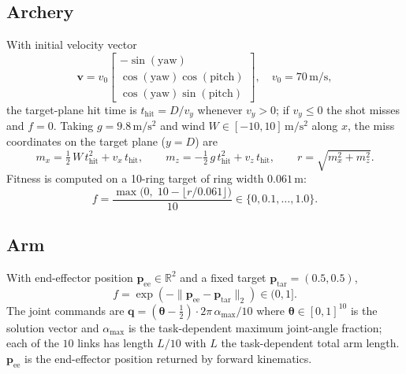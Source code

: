\subsection{Archery}
With initial velocity vector
\[
\mathbf{v} = v_0
\begin{bmatrix}
-\sin(\text{yaw}) \\
\cos(\text{yaw})\cos(\text{pitch}) \\
\cos(\text{yaw})\sin(\text{pitch})
\end{bmatrix},
\quad v_0 = 70\,\mathrm{m/s},
\]
the target-plane hit time is $t_{\text{hit}} = D/v_y$ whenever $v_y > 0$; if $v_y \le 0$ the shot misses and $f = 0$. Taking $g = 9.8\,\mathrm{m/s^2}$ and wind $W\in[-10,10]\,\mathrm{m/s^2}$ along $x$, the miss coordinates on the target plane ($y = D$) are
\[
m_x = \tfrac{1}{2}\,W\,t_{\text{hit}}^2 + v_x\,t_{\text{hit}},
\qquad
m_z = -\tfrac{1}{2}\,g\,t_{\text{hit}}^2 + v_z\,t_{\text{hit}},
\qquad
r = \sqrt{m_x^2 + m_z^2}.
\]
Fitness is computed on a 10-ring target of ring width $0.061\,\mathrm{m}$:
\[
f = \frac{\max\!\bigl(0,\; 10 - \lfloor r/0.061 \rfloor\bigr)}{10} \in \{0, 0.1, \ldots, 1.0\}.
\]

\subsection{Arm}
With end-effector position $\mathbf{p}_{\text{ee}}\in\mathbb{R}^2$ and a fixed target $\mathbf{p}_{\text{tar}} = (0.5, 0.5)$,
\[
f = \exp\!\left(-\lVert \mathbf{p}_{\text{ee}} - \mathbf{p}_{\text{tar}} \rVert_2\right) \in (0,1].
\]
The joint commands are $\mathbf{q} = (\boldsymbol{\theta}-\tfrac{1}{2})\cdot 2\pi\,\alpha_{\max}/10$ where $\boldsymbol{\theta}\in[0,1]^{10}$ is the solution vector and $\alpha_{\max}$ is the task-dependent maximum joint-angle fraction; each of the $10$ links has length $L/10$ with $L$ the task-dependent total arm length. $\mathbf{p}_{\text{ee}}$ is the end-effector position returned by forward kinematics.

